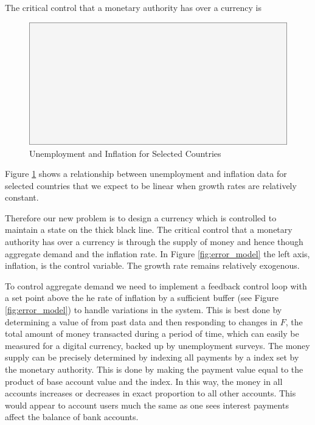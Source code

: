 The critical control that a monetary authority has over a currency is

\begin{figure}[H]
\centering
\includegraphics[scale=0.48]{blank}
\caption{Unemployment and Inflation for Selected Countries}
\label{fig:ui_multi}
\end{figure}

Figure \ref{fig:ui_multi} shows a relationship between unemployment and inflation data for selected
countries that we expect to be linear when growth rates are relatively constant.

Therefore our new problem is to design a currency which is controlled to maintain a
state on the thick black line. The critical control that a monetary authority has over a currency is
through the supply of money and hence though aggregate demand and the inflation rate. In Figure
\ref{fig:error_model} the left axis, inflation, is the control variable. The growth
rate remains relatively exogenous.

To control aggregate demand we need to implement a feedback control loop with a set point above the
he rate of inflation by a sufficient buffer (see Figure \ref{fig:error_model}) to handle variations
in the system. This is best done by determining a value of from past data and then responding to
changes in $F$, the
total amount of money transacted during a period of time, which can easily be measured for a digital
currency, backed up by unemployment surveys. The money supply can be precisely determined by
indexing all payments by a index set by the monetary authority. This is done by making the payment
value equal to the product of base account value and the index. In this way, the money in all
accounts increases or decreases in exact proportion to all other accounts. This would appear to
account users much the same as one sees interest payments affect the balance of bank accounts.

